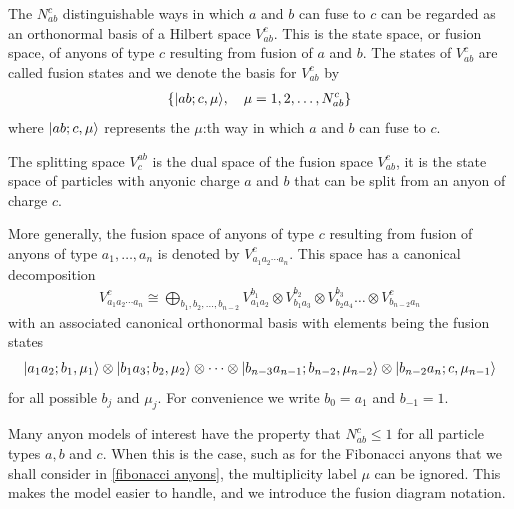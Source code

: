 \documentclass[a4paper,10pt,oneside]{book}
\theoremstyle{plain}
\theoremstyle{definition}
\theoremstyle{remark}
\DeclarePairedDelimiter\ket{\lvert}{\rangle}
\begin{document}


The $N_{ab}^c$ distinguishable ways in which $a$ and $b$ can fuse to $c$ can be regarded as an orthonormal basis of a Hilbert space $V_{ab}^c$. This is the state space, or fusion space, of anyons of type $c$ resulting from fusion of $a$ and $b$. The states of $V_{ab}^c$ are called fusion states and we denote the basis for $V_{ab}^c$ by
\begin{align*}
  \{ \ket{ab;c,\mu}, \quad \mu = 1,2,\ldots,N_{ab}^c \}
\end{align*}
where $\ket{ab;c,\mu}$ represents the $\mu$:th way in which $a$ and $b$ can fuse to $c$.

The splitting space $V_c^{ab}$ is the dual space of the fusion space $V_{ab}^c$, it is the state space of particles with anyonic charge $a$ and $b$ that can be split from an anyon of charge $c$.

More generally, the fusion space of anyons of type $c$ resulting from fusion of anyons of type $a_1, \ldots, a_n$ is denoted by $V_{a_1 a_2 \cdots a_n}^c$. This space has a canonical decomposition
\begin{align*}
  V_{a_1 a_2 \cdots a_n}^c \cong \bigoplus_{b_1,b_2,\ldots,b_{n-2}} V_{a_1a_2}^{b_1} \otimes V_{b_1 a_3}^{b_2} \otimes V_{b_2 a_4}^{b_3} \ldots \otimes V_{b_{n-2} a_n}^c
\end{align*}
with an associated canonical orthonormal basis with elements being the fusion states
\begin{align*}
  \ket{a_1 a_2; b_1, \mu_1} \otimes \ket{b_1 a_3; b_2, \mu_2} \otimes \cdots \otimes \ket{b_{n-3} a_{n-1}; b_{n-2}, \mu_{n-2}} \otimes \ket{b_{n-2} a_n; c, \mu_{n-1}}
\end{align*}
for all possible $b_j$ and $\mu_j$. For convenience we write $b_{0} = a_1$ and $b_{-1} = 1$.

Many anyon models of interest have the property that $N_{ab}^c \le 1$ for all particle types $a, b$ and $c$. When this is the case, such as for the Fibonacci anyons that we shall consider in \cref{fibonacci anyons}, the multiplicity label $\mu$ can be ignored. This makes the model easier to handle, and we introduce the fusion diagram notation.
\end{document}
